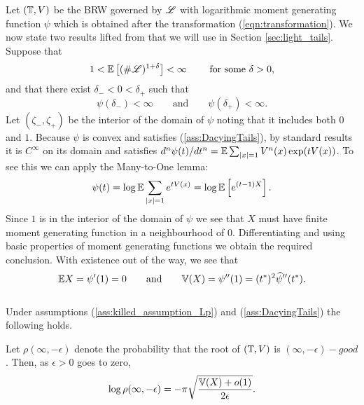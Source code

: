 Let $(\mathbb{T}, V)$ be the BRW governed by $\mathscr{L}$ with logarithmic moment generating function $\psi$ which is obtained after the transformation (\ref{eqn:transformation}). We now state two results lifted from \cite{gantert2008asymptotics} that we will use in Section \ref{sec:light_tails}. Suppose that 
\begin{equation}\label{ass:killed_assumption_Lp}
1 < \mathbb{E}\left[ (\# \mathscr{L})^{1 + \delta} \right] < \infty\qquad\text{ for some } \delta > 0, 
\end{equation}
and that there exist $\delta_- < 0 < \delta_+$ such that
\begin{equation}\label{ass:DacyingTails}
\psi(\delta_-) < \infty \qquad\text{and}\qquad \psi(\delta_+) < \infty. 
\end{equation}
Let $(\zeta_-, \zeta_+)$ be the interior of the domain of $\psi$ noting that it includes both $0$ and $1$. Because $\psi$ is convex and satisfies (\ref{ass:DacyingTails}), by standard results it is $C^\infty$ on its domain and satisfies $d^n \psi(t) / dt^n = \mathbb{E} \sum_{|x|=1} V^n(x) \exp(t V(x))$. To see this we can apply the Many-to-One lemma:
\begin{equation}\nonumber
\psi(t) = \log \mathbb{E} \sum\limits_{|x| = 1} e^{t V(x)} = \log \mathbb{E}\left[ e^{(t - 1)X} \right]. 
\end{equation}
Since $1$ is in the interior of the domain of $\psi$ we see that $X$ must have finite moment generating function in a neighbourhood of $0$. Differentiating and using basic properties of moment generating functions we obtain the required conclusion. With existence out of the way, we see that 
\begin{equation}\nonumber
\mathbb{E}{X} = \psi'(1) = 0 \qquad\text{and}\qquad \mathbb{V}(X) = \psi''(1) = (t^*)^2 \widehat{\psi}''(t^*). 
\end{equation} \\

Under assumptions (\ref{ass:killed_assumption_Lp}) and (\ref{ass:DacyingTails}) the following holds. 
\begin{theorem}\label{thm:infty_good}
Let $\rho(\infty, - \epsilon)$ denote the probability that the root of $(\mathbb{T}, V)$ is $(\infty, - \epsilon)-good$. Then, as $\epsilon > 0$ goes to zero, 
\begin{equation}\nonumber
\log\rho(\infty, - \epsilon) = - \pi \sqrt{\frac{\mathbb{V}(X) + o(1)}{2 \epsilon}}. 
\end{equation}
\end{theorem}

